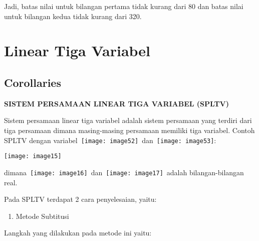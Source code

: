 \documentclass[11pt,fleqn]{book} %
\begin{document}
\noindent Jadi, batas nilai untuk bilangan pertama tidak kurang dari 80 dan batas nilai untuk bilangan kedua tidak kurang dari 320.



\chapter{Linear Tiga Variabel}

\section{Corollaries}

\noindent \textbf{SISTEM PERSAMAAN LINEAR TIGA VARIABEL (SPLTV)}

\noindent Sistem persamaan linear tiga variabel adalah sistem persamaan yang terdiri dari tiga persamaan dimana masing-masing persamaan memiliki tiga variabel. Contoh SPLTV dengan variabel~\texttt{[image: image52]}~dan~\texttt{[image: image53]}:

\noindent \texttt{[image: image15]}

\noindent dimana~\texttt{[image: image16]}~dan~\texttt{[image: image17]}~adalah bilangan-bilangan real.

\noindent Pada SPLTV terdapat 2 cara penyelesaian, yaitu:

\begin{enumerate}
\item  Metode Subtitusi
\end{enumerate}

\noindent Langkah yang dilakukan pada metode ini yaitu:
\end{document}
